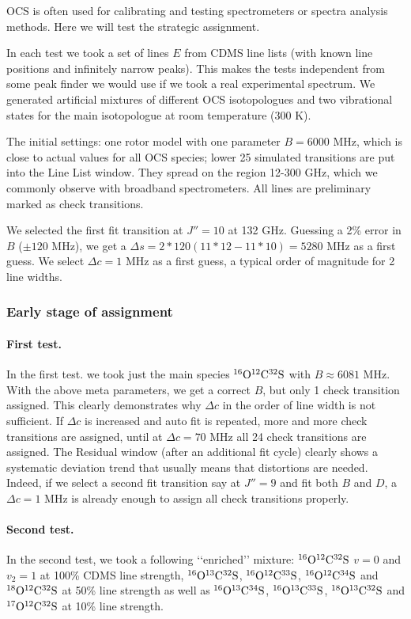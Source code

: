 \documentclass[11pt]{article}
\begin{document}
OCS is often used for calibrating and testing spectrometers or spectra analysis methods. Here we will test the strategic assignment. 

In each test we took a set of lines $E$ from CDMS line lists (with known line positions and infinitely narrow peaks). This makes the tests independent from some peak finder we would use if we took a real experimental spectrum. We generated artificial mixtures of different OCS isotopologues and two vibrational states for the main isotopologue at room temperature (300 K).

The initial settings: one rotor model with one parameter $B = 6000$ MHz, which is close to actual values for all OCS species; lower 25 simulated transitions are put into the Line List window. They spread on the region 12-300 GHz, which we commonly observe with broadband spectrometers. All lines are preliminary marked as check transitions. 

We selected the first fit transition at $J'' = 10$ at 132 GHz. Guessing a 2\% error in $B$ ($\pm 120$ MHz), we get a $\Delta s = 2*120(11*12 - 11*10) = 5280$ MHz as a first guess. We select $\Delta c = 1$ MHz as a first guess, a typical order of magnitude for 2 line widths.

\subsubsection{Early stage of assignment}

\paragraph{First test.} 
In the first test. we took just the main species $\rm ^{16}O^{12}C^{32}S$ with $B \approx 6081$ MHz. With the above meta parameters, we get a correct $B$, but only 1 check transition assigned. This clearly demonstrates why $\Delta c$ in the order of line width is not sufficient. If $\Delta c$ is increased and auto fit is repeated, more and more check transitions are assigned, until at $\Delta c = 70$ MHz all 24 check transitions are assigned. The Residual window (after an additional fit cycle) clearly shows a systematic deviation trend that usually means that distortions are needed. Indeed, if we select a second fit transition say at $J'' = 9$ and fit both $B$ and $D$, a $\Delta c = 1$ MHz is already enough to assign all check transitions properly.

\paragraph{Second test.}
In the second test, we took a following \lq\lq{}enriched\rq\rq{} mixture: $\rm ^{16}O^{12}C^{32}S$ $v = 0$ and $v_2 = 1$ at 100\% CDMS line strength, 
$\rm ^{16}O^{13}C^{32}S$, $\rm ^{16}O^{12}C^{33}S$, $\rm ^{16}O^{12}C^{34}S$ and $\rm ^{18}O^{12}C^{32}S$ at 50\% line strength as well as $\rm ^{16}O^{13}C^{34}S$, $\rm ^{16}O^{13}C^{33}S$, $\rm ^{18}O^{13}C^{32}S$ and $\rm ^{17}O^{12}C^{32}S$ at 10\% line strength. 
\end{document}
